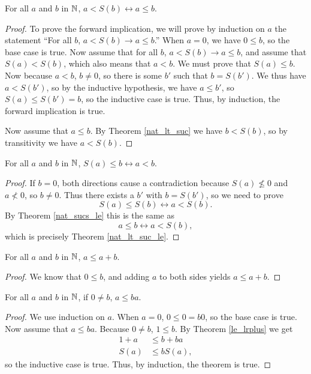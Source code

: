 \documentclass[../../math.tex]{subfiles}
\begin{document}
\begin{theorem} \label{nat_lt_suc_le}
    For all $a$ and $b$ in $\mathbb{N}$, $a < S(b) \leftrightarrow a \leq b$.
\end{theorem}
\begin{proof}
    To prove the forward implication, we will prove by induction on $a$ the
    statement ``For all $b$, $a < S(b) \rightarrow a \leq b$.''  When $a = 0$,
    we have $0 \leq b$, so the base case is true.  Now assume that for all $b$,
    $a < S(b) \rightarrow a \leq b$, and assume that $S(a) < S(b)$, which also
    means that $a < b$.  We must prove that $S(a) \leq b$.  Now because $a < b$,
    $b \neq 0$, so there is some $b'$ such that $b = S(b')$.  We thus have $a <
    S(b')$, so by the inductive hypothesis, we have $a \leq b'$, so $S(a) \leq
    S(b') = b$, so the inductive case is true.  Thus, by induction, the forward
    implication is true.

    Now assume that $a \leq b$.  By Theorem \ref{nat_lt_suc} we have $b < S(b)$,
    so by transitivity we have $a < S(b)$.
\end{proof}

\begin{theorem} \label{nat_le_suc_lt}
    For all $a$ and $b$ in $\mathbb{N}$, $S(a) \leq b \leftrightarrow a < b$.
\end{theorem}
\begin{proof}
    If $b = 0$, both directions cause a contradiction because $S(a) \nleq 0$ and
    $a \nless 0$, so $b \neq 0$.  Thus there exists a $b'$ with $b = S(b')$, so
    we need to prove
    \[
        S(a) \leq S(b) \leftrightarrow a < S(b).
    \]
    By Theorem \ref{nat_sucs_le} this is the same as
    \[
        a \leq b \leftrightarrow a < S(b),
    \]
    which is precisely Theorem \ref{nat_lt_suc_le}.
\end{proof}

\begin{theorem} \label{nat_le_self_lplus}
    For all $a$ and $b$ in $\mathbb{N}$, $a \leq a + b$.
\end{theorem}
\begin{proof}
    We know that $0 \leq b$, and adding $a$ to both sides yields $a \leq a + b$.
\end{proof}

\begin{theorem} \label{nat_le_self_lmult}
    For all $a$ and $b$ in $\mathbb{N}$, if $0 \neq b$, $a \leq ba$.
\end{theorem}
\begin{proof}
    We use induction on $a$.  When $a = 0$, $0 \leq 0 = b0$, so the base case is
    true.  Now assume that $a \leq ba$.  Because $0 \neq b$, $1 \leq b$.  By
    Theorem \ref{le_lrplus} we get
    \begin{align*}
        1 + a &\leq b + ba \\
        S(a) &\leq bS(a),
    \end{align*}
    so the inductive case is true.  Thus, by induction, the theorem is true.
\end{proof}
\end{document}
